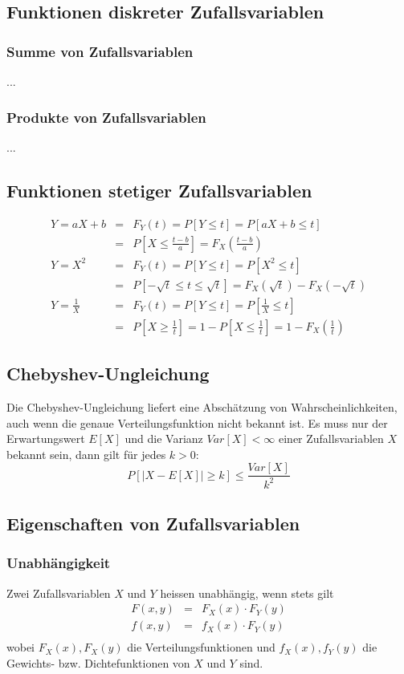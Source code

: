 \documentclass[10pt,a4paper,twocolumn]{article}
\begin{document}
\subsection{Funktionen diskreter Zufallsvariablen}

\subsubsection{Summe von Zufallsvariablen}
...

\subsubsection{Produkte von Zufallsvariablen}
...

\subsection{Funktionen stetiger Zufallsvariablen}
\[
\begin{array}{rcl}
	Y=aX+b & = & F_Y(t)=P[Y\leq t]=P[aX+b\leq t] \\
	& = & P[X\leq \frac{t-b}{a}]=F_X(\frac{t-b}{a}) \\
	Y=X^2 & = & F_Y(t)=P[Y\leq t]=P[X^2\leq t] \\
	& = & P[-\sqrt{t}\leq t\leq\sqrt{t}]=F_X(\sqrt{t})-F_X(-\sqrt{t}) \\
	Y=\frac{1}{X} & = & F_Y(t)=P[Y\leq t]=P[\frac{1}{X}\leq t] \\
	& = & P[X\geq\frac{1}{t}]=1-P[X\leq\frac{1}{t}]=1-F_X(\frac{1}{t})
\end{array}
\]

\subsection{Chebyshev-Ungleichung}
Die Chebyshev-Ungleichung liefert eine Abschätzung von Wahrscheinlichkeiten, auch wenn die genaue Verteilungsfunktion nicht bekannt ist. Es muss nur der Erwartungswert $E[X]$ und die Varianz $Var[X] < \infty$ einer Zufallsvariablen $X$ bekannt sein, dann gilt für jedes $k > 0$:
\[
P\left[|X - E[X]| \geq k \right] \leq \frac{Var[X]}{k^2}
\]

\subsection{Eigenschaften von Zufallsvariablen}

\subsubsection{Unabhängigkeit}
Zwei Zufallsvariablen $X$ und $Y$ heissen unabhängig, wenn stets gilt
\[
\begin{array}{rcl}
	F(x,y) & = & F_X(x) \cdot F_Y(y) \\
	f(x,y) & = & f_X(x) \cdot F_Y(y) \\
\end{array}
\]
wobei $F_X(x), F_X(y)$ die Verteilungsfunktionen und $f_X(x), f_Y(y)$ die Gewichts- bzw. Dichtefunktionen von $X$ und $Y$ sind.
\end{document}
